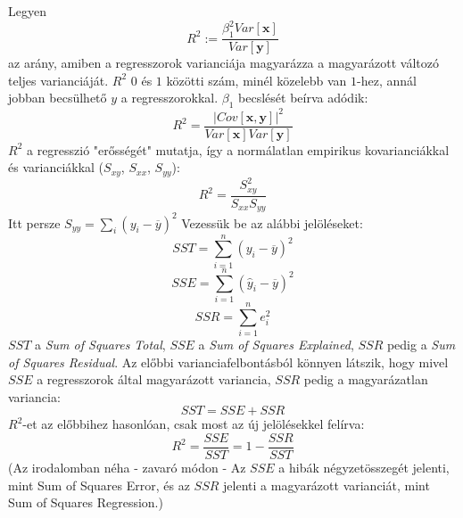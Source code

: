 \documentclass[14p]{report}
\def\pmb{\boldsymbol}
\def\bar{\overline}
\begin{document}
\\
\\
Legyen
\[
	R^2 := \frac{\beta_1^2Var[\pmb{x}]}{Var[\pmb{y}]}
\]
az arány, amiben a regresszorok varianciája magyarázza a magyarázott változó teljes varianciáját. $R^2$ $0$ és $1$ közötti szám, minél közelebb van $1$-hez, annál jobban becsülhető $y$ a regresszorokkal. $\beta_1$ becslését beírva adódik:
\[
	R^2 = \frac{|Cov[\pmb{x},\pmb{y}]|^2}{Var[\pmb{x}]Var[\pmb{y}]}
\]
$R^2$ a regresszió "erősségét" mutatja, így a normálatlan empirikus kovarianciákkal és varianciákkal ($S_{xy}$, $S_{xx}$, $S_{yy}$):
\[
	R^2 = \frac{S^2_{xy}}{S_{xx}S_{yy}}
\]
Itt persze $S_{yy} = \sum_i{(y_i - \bar{y})^2}$
Vezessük be az alábbi jelöléseket:
\[
	SST = \sum_{i=1}^{n}{(y_i - \bar{y})^2}
\]
\[
	SSE = \sum_{i=1}^{n}{(\hat{y}_i - \bar{y})^2}
\]
\[
	SSR = \sum_{i=1}^{n}{e_i^2}
\]
$SST$ a \emph{Sum of Squares Total}, $SSE$ a \emph{Sum of Squares Explained}, $SSR$ pedig a \emph{Sum of Squares Residual}. Az előbbi varianciafelbontásból könnyen látszik, hogy mivel $SSE$ a regresszorok által magyarázott variancia, $SSR$ pedig a magyarázatlan variancia:
\[
	SST = SSE + SSR
\]
$R^2$-et az előbbihez hasonlóan, csak most az új jelölésekkel felírva:
\[
	R^2 = \frac{SSE}{SST} = 1- \frac{SSR}{SST}
\]
(Az irodalomban néha - zavaró módon - Az $SSE$ a hibák négyzetösszegét jelenti, mint Sum of Squares Error, és az $SSR$ jelenti a magyarázott varianciát, mint Sum of Squares Regression.)
\end{document}
